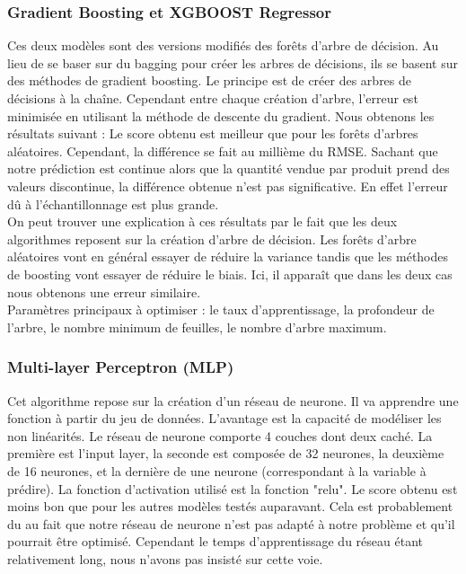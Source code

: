 \documentclass{article} %
\begin{document}
\subsubsection{Gradient Boosting et XGBOOST Regressor}
Ces deux modèles sont des versions modifiés des forêts d'arbre de décision. Au lieu de se baser sur du bagging pour créer les arbres de décisions, ils se basent sur des méthodes de gradient boosting. Le principe est de créer des arbres de décisions à la chaîne. Cependant entre chaque création d'arbre, l'erreur est minimisée en utilisant la méthode de descente du gradient. Nous obtenons les résultats suivant :
Le score obtenu est meilleur que pour les forêts d'arbres aléatoires. Cependant, la différence se fait au millième du RMSE. Sachant que notre prédiction est continue alors que la quantité vendue par produit prend des valeurs discontinue, la différence obtenue n'est pas significative. En effet l'erreur dû à l'échantillonnage est plus grande.\\
On peut trouver une explication à ces résultats par le fait que les deux algorithmes reposent sur la création d'arbre de décision. Les forêts d'arbre aléatoires vont en général essayer de réduire la variance tandis que les méthodes de boosting vont essayer de réduire le biais. Ici, il apparaît que dans les deux cas nous obtenons une erreur similaire.\\
Paramètres principaux à optimiser : le taux d'apprentissage, la profondeur de l'arbre, le nombre minimum de feuilles, le nombre d'arbre maximum.

\subsubsection{Multi-layer Perceptron (MLP)}
Cet algorithme repose sur la création d'un réseau de neurone. Il va apprendre une fonction à partir du jeu de données. L'avantage est la capacité de modéliser les non linéarités. Le réseau de neurone comporte 4 couches dont deux caché. La première est l'input layer, la seconde est composée de 32 neurones, la deuxième de 16 neurones, et la dernière de une neurone (correspondant à la variable à prédire). La fonction d'activation utilisé est la fonction "relu". 
Le score obtenu est moins bon que pour les autres modèles testés auparavant. Cela est probablement du au fait que notre réseau de neurone n'est pas adapté à notre problème et qu'il pourrait être optimisé. Cependant le temps d'apprentissage du réseau étant relativement long, nous n'avons pas insisté sur cette voie. 
\end{document}
